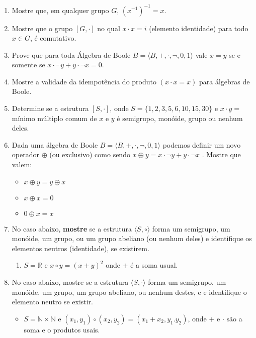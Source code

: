 \documentclass[]{book}
\theoremstyle{definition}
\begin{document}
\begin{enumerate}

\item \label{caushw} Mostre que, em qualquer grupo $G$, $(x^{-1})^{-1} = x$.

\item \label{caushw} Mostre que o grupo $[G, \cdot]$ no qual $x \cdot x = i$ (elemento identidade) para todo $x \in G$, é comutativo.

\item \label{caushw} Prove que para toda Álgebra de Boole  $B = \langle B,+, \cdot, \neg, 0, 1 \rangle$ vale $x=y$  se e somente se $  x\cdot \neg y+ y \cdot \neg x= 0$.

\item \label{caushw} Mostre a validade da idempotência do produto $(x \cdot x  =  x)$ para álgebras de Boole.

\item \label{caushw} Determine se a estrutura $[S, \cdot]$, onde $S = \{1,2,3,5,6,10,15,30\}$ e $x \cdot y =$ mínimo múltiplo comum de $x$ e $y$ é semigrupo, monóide, grupo ou nenhum deles.

\item \label{caushw} Dada uma álgebra de Boole $B = \langle B,+, \cdot, \neg, 0, 1 \rangle$ podemos definir um novo operador $\oplus$ (ou exclusivo) como sendo $x \oplus y = x \cdot \neg y +  y \cdot \neg x$ . Mostre que valem:

\begin{itemize}
\item $x \oplus y = y \oplus x$
\item $x \oplus x = 0$
\item $0 \oplus x = x$
\end{itemize}

\item \label{caushw} No caso abaixo, \textbf{mostre} se a estrutura $\langle S, \circ \rangle$ forma um semigrupo, um mon\'{o}ide, um grupo, ou um grupo abeliano (ou nenhum deles) e identifique os elementos neutros (identidade), se existirem.

\begin{enumerate}
 \item $S=\mathbb{R}$ e $x\circ y=(x+y)^2$ onde $+$ \'{e} a soma usual.
\end{enumerate}

\item \label{caushw} No caso abaixo, mostre se a estrutura $ \langle S , \cdot \rangle$ forma um semigrupo, um monóide, um grupo, um grupo abeliano, ou nenhum destes, e e identifique o elemento neutro se existir.

\begin{itemize}
\item $S=\mathbb{N} \times \mathbb{N}$ e $(x_{1}, y_{1}) \circ (x_{2}, y_{2}) = (x_{1} + x_{2}, y_{1} . y_{2})$, onde $+$ e $\cdot$ são a soma e o produtos usais.
\end{itemize}

\end{enumerate}
\end{document}
